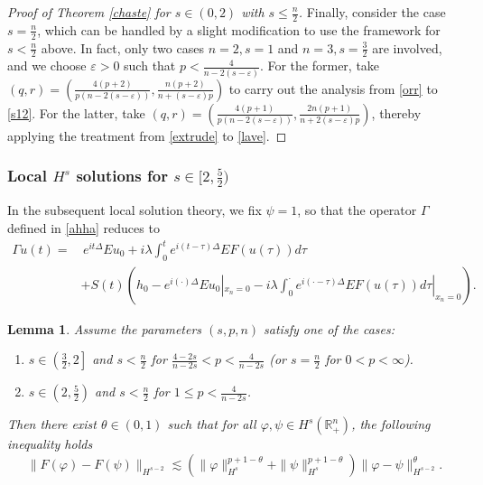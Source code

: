 \documentclass[preprint,compress,12pt]{elsarticle}
\newtheorem{lemma}[theorem]{Lemma}
\numberwithin{equation}{section}
\begin{document}
\begin{proof}[Proof of Theorem \ref{chaste} for $s\in(0,2)$ with $s\leq \frac{n}{2}$]
	Finally, consider the case \(s = \frac{n}{2}\), which can be handled by a slight modification to use the framework for \(s < \frac{n}{2}\) above. In fact, only two cases \(n=2, s=1\) and \(n=3, s=\frac{3}{2}\) are involved, and we choose \(\varepsilon > 0\) such that \(p < \frac{4}{n-2(s-\varepsilon)}\). For the former, take $(q, r) = \left( \frac{4(p+2)}{p(n-2(s-\varepsilon))}, \frac{n(p+2)}{n+(s-\varepsilon)p} \right)$ to carry out the analysis from \eqref{orr} to \eqref{s12}. For the latter, take $(q, r) = \left( \frac{4(p+1)}{p(n-2(s-\varepsilon))}, \frac{2n(p+1)}{n+2(s-\varepsilon)p} \right)$, thereby applying the treatment from \eqref{extrude} to \eqref{lave}.
\end{proof}
\subsubsection{Local $H^{s}$ solutions for $s\in[2,\frac{5}{2})$}
In the subsequent local solution theory, we fix $\psi=1$,  so that the operator $\Gamma$ defined in \eqref{ahha} reduces to
\begin{equation}\label{turbid}
	\begin{aligned}
		\Gamma u(t)=&\,e^{it\Delta}Eu_{0}+i\lambda\int_{0}^{t}e^{i(t-\tau)\Delta}EF(u(\tau))d\tau\\	&+S(t)\left(h_{0}-e^{i(\cdot)\Delta}Eu_{0}|_{x_{n}=0}-i\lambda\int_{0}^{\cdot}e^{i(\cdot-\tau)\Delta}EF(u(\tau))d\tau|_{x_{n}=0}\right).
	\end{aligned}
\end{equation}
\begin{lemma}\label{assimilate}
	Assume the parameters $(s,p,n)$ satisfy one of the cases:
	\begin{enumerate}[label=(\roman*)]
		\item  $s\in\left(\frac{3}{2},2\right]$ and $s<\frac{n}{2}$ for  $\frac{4-2s}{n-2s}<p<\frac{4}{n-2s}$ (or $s=\frac{n}{2}$ for $0<p<\infty$).
		\item $s\in\left(2,\frac{5}{2}\right)$ and $s<\frac{n}{2}$ for $1\leq p<\frac{4}{n-2s}$.
	\end{enumerate}
	Then there exist $\theta\in(0,1)$ such that for all $\varphi, \psi\in H^{s}(\mathbb{R}_{+}^{n})$, the following inequality holds
	\begin{equation}\label{cen}
		\|F(\varphi)-F(\psi)\|_{H^{s-2}}\lesssim \left(\|\varphi\|_{H^{s}}^{p+1-\theta}+\|\psi\|_{H^{s}}^{p+1-\theta}\right)
		\|\varphi-\psi\|_{H^{s-2}}^{\theta}.
	\end{equation}
\end{lemma}
\end{document}
